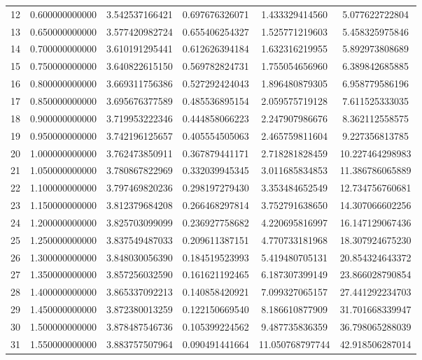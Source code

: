 \documentclass{article}
\begin{document}
\begin{table}
\begin{tabular}{S[table-format=2] S[table-format=1.2] S[table-format=1.9]
S[table-format=1.9] S[table-format=2.8] S[table-format=3.7]}
12 & 0.600000000000 & 3.542537166421 & 0.697676326071 & 1.433329414560 & 5.077622722804 \\
13 & 0.650000000000 & 3.577420982724 & 0.655406254327 & 1.525771219603 & 5.458325975846 \\
14 & 0.700000000000 & 3.610191295441 & 0.612626394184 & 1.632316219955 & 5.892973808689 \\
15 & 0.750000000000 & 3.640822615150 & 0.569782824731 & 1.755054656960 & 6.389842685885 \\
16 & 0.800000000000 & 3.669311756386 & 0.527292424043 & 1.896480879305 & 6.958779586196 \\
17 & 0.850000000000 & 3.695676377589 & 0.485536895154 & 2.059575719128 & 7.611525333035 \\
18 & 0.900000000000 & 3.719953222346 & 0.444858066223 & 2.247907986676 & 8.362112558575 \\
19 & 0.950000000000 & 3.742196125657 & 0.405554505063 & 2.465759811604 & 9.227356813785 \\
20 & 1.000000000000 & 3.762473850911 & 0.367879441171 & 2.718281828459 & 10.227464298983 \\
21 & 1.050000000000 & 3.780867822969 & 0.332039945345 & 3.011685834853 & 11.386786065889 \\
22 & 1.100000000000 & 3.797469820236 & 0.298197279430 & 3.353484652549 & 12.734756760681 \\
23 & 1.150000000000 & 3.812379684208 & 0.266468297814 & 3.752791638650 & 14.307066602256 \\
24 & 1.200000000000 & 3.825703099099 & 0.236927758682 & 4.220695816997 & 16.147129067436 \\
25 & 1.250000000000 & 3.837549487033 & 0.209611387151 & 4.770733181968 & 18.307924675230 \\
26 & 1.300000000000 & 3.848030056390 & 0.184519523993 & 5.419480705131 & 20.854324643372 \\
27 & 1.350000000000 & 3.857256032590 & 0.161621192465 & 6.187307399149 & 23.866028790854 \\
28 & 1.400000000000 & 3.865337092213 & 0.140858420921 & 7.099327065157 & 27.441292234703 \\
29 & 1.450000000000 & 3.872380013259 & 0.122150669540 & 8.186610877909 & 31.701668339947 \\
30 & 1.500000000000 & 3.878487546736 & 0.105399224562 & 9.487735836359 & 36.798065288039 \\
31 & 1.550000000000 & 3.883757507964 & 0.090491441664 & 11.050768797744 & 42.918506287014 \\

\end{tabular}
\end{table}
\end{document}
